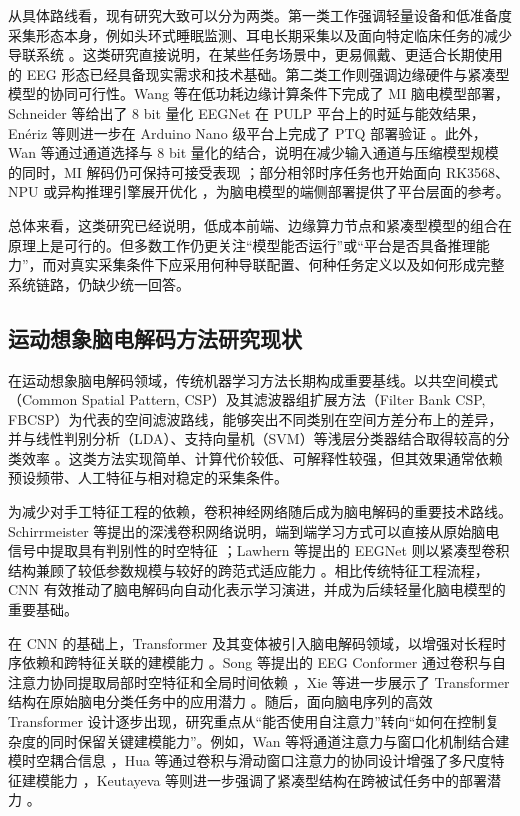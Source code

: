 从具体路线看，现有研究大致可以分为两类。第一类工作强调轻量设备和低准备度采集形态本身，例如头环式睡眠监测、耳电长期采集以及面向特定临床任务的减少导联系统 \cite{Arn20, Deb15, Bio22}。这类研究直接说明，在某些任务场景中，更易佩戴、更适合长期使用的 EEG 形态已经具备现实需求和技术基础。第二类工作则强调边缘硬件与紧凑型模型的协同可行性。Wang 等在低功耗边缘计算条件下完成了 MI 脑电模型部署，Schneider 等给出了 8 bit 量化 EEGNet 在 PULP 平台上的时延与能效结果，En\'eriz 等则进一步在 Arduino Nano 级平台上完成了 PTQ 部署验证 \cite{Wan20, Sch20, Ene23}。此外，Wan 等通过通道选择与 8 bit 量化的结合，说明在减少输入通道与压缩模型规模的同时，MI 解码仍可保持可接受表现 \cite{Wan22b}；部分相邻时序任务也开始面向 RK3568、NPU 或异构推理引擎展开优化 \cite{You24, Ism23}，为脑电模型的端侧部署提供了平台层面的参考。

总体来看，这类研究已经说明，低成本前端、边缘算力节点和紧凑型模型的组合在原理上是可行的。但多数工作仍更关注“模型能否运行”或“平台是否具备推理能力”，而对真实采集条件下应采用何种导联配置、何种任务定义以及如何形成完整系统链路，仍缺少统一回答。

\subsection{运动想象脑电解码方法研究现状}

在运动想象脑电解码领域，传统机器学习方法长期构成重要基线。以共空间模式（Common Spatial Pattern, CSP）及其滤波器组扩展方法（Filter Bank CSP, FBCSP）为代表的空间滤波路线，能够突出不同类别在空间方差分布上的差异，并与线性判别分析（LDA）、支持向量机（SVM）等浅层分类器结合取得较高的分类效率 \cite{ang2012filter, lotte2018review}。这类方法实现简单、计算代价较低、可解释性较强，但其效果通常依赖预设频带、人工特征与相对稳定的采集条件。

为减少对手工特征工程的依赖，卷积神经网络随后成为脑电解码的重要技术路线。Schirrmeister 等提出的深浅卷积网络说明，端到端学习方式可以直接从原始脑电信号中提取具有判别性的时空特征 \cite{schirrmeister2017deep}；Lawhern 等提出的 EEGNet 则以紧凑型卷积结构兼顾了较低参数规模与较好的跨范式适应能力 \cite{lawhern2018eegnet}。相比传统特征工程流程，CNN 有效推动了脑电解码向自动化表示学习演进，并成为后续轻量化脑电模型的重要基础。

在 CNN 的基础上，Transformer 及其变体被引入脑电解码领域，以增强对长程时序依赖和跨特征关联的建模能力 \cite{vaswani2017attention}。Song 等提出的 EEG Conformer 通过卷积与自注意力协同提取局部时空特征和全局时间依赖 \cite{songEEG2022}，Xie 等进一步展示了 Transformer 结构在原始脑电分类任务中的应用潜力 \cite{xie_transformer-based_2022}。随后，面向脑电序列的高效 Transformer 设计逐步出现，研究重点从“能否使用自注意力”转向“如何在控制复杂度的同时保留关键建模能力”。例如，Wan 等将通道注意力与窗口化机制结合建模时空耦合信息 \cite{wan2023novel}，Hua 等通过卷积与滑动窗口注意力的协同设计增强了多尺度特征建模能力 \cite{hua2023improved}，Keutayeva 等则进一步强调了紧凑型结构在跨被试任务中的部署潜力 \cite{keu2024compact}。

